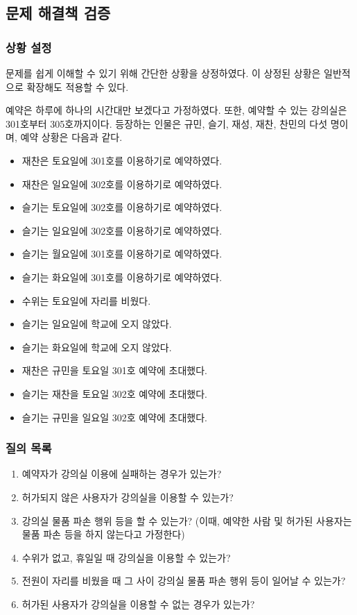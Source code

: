 \documentclass[11pt,a4paper]{article}
\begin{document}
\subsection{문제 해결책 검증}

\subsubsection{상황 설정}
문제를 쉽게 이해할 수 있기 위해 간단한 상황을 상정하였다. 이 상정된 상황은
일반적으로 확장해도 적용할 수 있다.

예약은 하루에 하나의 시간대만 보겠다고 가정하였다. 또한, 예약할 수 있는
강의실은 301호부터 305호까지이다. 등장하는 인물은 규민, 슬기, 재성, 재찬,
찬민의 다섯 명이며, 예약 상황은 다음과 같다.

\begin{itemize}
\item 재찬은 토요일에 301호를 이용하기로 예약하였다.
\item 재찬은 일요일에 302호를 이용하기로 예약하였다.
\item 슬기는 토요일에 302호를 이용하기로 예약하였다.
\item 슬기는 일요일에 302호를 이용하기로 예약하였다.
\item 슬기는 월요일에 301호를 이용하기로 예약하였다.
\item 슬기는 화요일에 301호를 이용하기로 예약하였다.
\item 수위는 토요일에 자리를 비웠다.
\item 슬기는 일요일에 학교에 오지 않았다.
\item 슬기는 화요일에 학교에 오지 않았다.
\item 재찬은 규민을 토요일 301호 예약에 초대했다.
\item 슬기는 재찬을 토요일 302호 예약에 초대했다.
\item 슬기는 규민을 일요일 302호 예약에 초대했다.
\end{itemize}

\subsubsection{질의 목록}
\begin{enumerate}
\item 예약자가 강의실 이용에 실패하는 경우가 있는가?
\item 허가되지 않은 사용자가 강의실을 이용할 수 있는가?
\item 강의실 물품 파손 행위 등을 할 수 있는가? (이때, 예약한 사람 및 허가된 사용자는 물품 파손 등을 하지 않는다고 가정한다)
\item 수위가 없고, 휴일일 때 강의실을 이용할 수 있는가?
\item 전원이 자리를 비웠을 때 그 사이 강의실 물품 파손 행위 등이 일어날 수 있는가?
\item 허가된 사용자가 강의실을 이용할 수 없는 경우가 있는가?
\end{enumerate}
\end{document}
